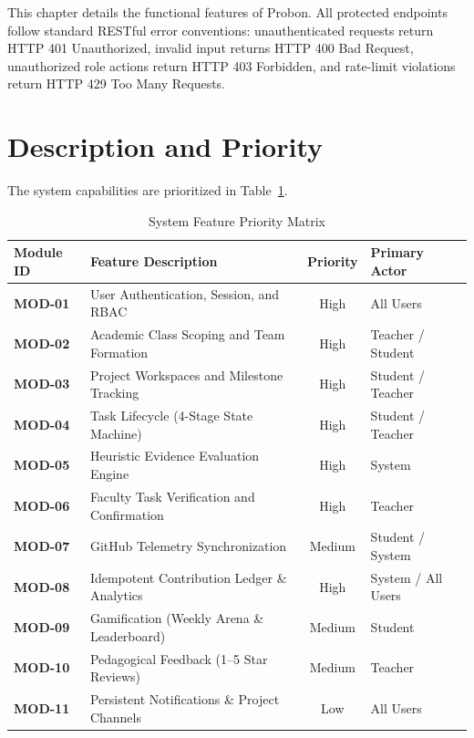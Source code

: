 \documentclass{scrreprt}
\begin{document}
This chapter details the functional features of Probon. All protected endpoints follow standard RESTful error conventions: unauthenticated requests return HTTP 401 Unauthorized, invalid input returns HTTP 400 Bad Request, unauthorized role actions return HTTP 403 Forbidden, and rate-limit violations return HTTP 429 Too Many Requests.

\section{Description and Priority}\label{sec:feature_priority}
The system capabilities are prioritized in Table~\ref{tab:feature_priority}.

\begin{table}[H]
\centering
\begin{tabularx}{\textwidth}{|l|l|c|X|}
    \hline
    \textbf{Module ID} & \textbf{Feature Description} & \textbf{Priority} & \textbf{Primary Actor} \\
    \hline
    \textbf{MOD-01} & User Authentication, Session, and RBAC & High & All Users \\
    \textbf{MOD-02} & Academic Class Scoping and Team Formation & High & Teacher / Student \\
    \textbf{MOD-03} & Project Workspaces and Milestone Tracking & High & Student / Teacher \\
    \textbf{MOD-04} & Task Lifecycle (4-Stage State Machine) & High & Student / Teacher \\
    \textbf{MOD-05} & Heuristic Evidence Evaluation Engine & High & System \\
    \textbf{MOD-06} & Faculty Task Verification and Confirmation & High & Teacher \\
    \textbf{MOD-07} & GitHub Telemetry Synchronization & Medium & Student / System \\
    \textbf{MOD-08} & Idempotent Contribution Ledger \& Analytics & High & System / All Users \\
    \textbf{MOD-09} & Gamification (Weekly Arena \& Leaderboard) & Medium & Student \\
    \textbf{MOD-10} & Pedagogical Feedback (1--5 Star Reviews) & Medium & Teacher \\
    \textbf{MOD-11} & Persistent Notifications \& Project Channels & Low & All Users \\
    \hline
\end{tabularx}
\caption{System Feature Priority Matrix}
\label{tab:feature_priority}
\end{table}
\end{document}
